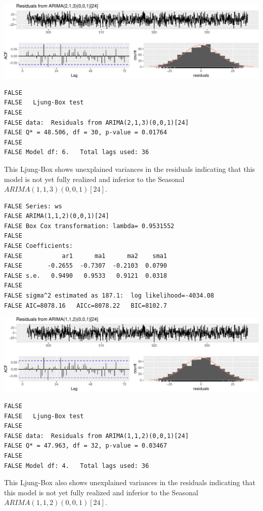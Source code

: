 \documentclass[openany]{book}
\begin{document}
\includegraphics{Part-C-BP_files/figure-latex/unnamed-chunk-11-1.pdf}

\begin{verbatim}
FALSE 
FALSE   Ljung-Box test
FALSE 
FALSE data:  Residuals from ARIMA(2,1,3)(0,0,1)[24]
FALSE Q* = 48.506, df = 30, p-value = 0.01764
FALSE 
FALSE Model df: 6.   Total lags used: 36
\end{verbatim}

This Ljung-Box shows unexplained variances in the residuals indicating
that this model is not yet fully realized and inferior to the Seasonal
\(ARIMA (1,1,3)(0,0,1)[24]\).

\begin{verbatim}
FALSE Series: ws 
FALSE ARIMA(1,1,2)(0,0,1)[24] 
FALSE Box Cox transformation: lambda= 0.9531552 
FALSE 
FALSE Coefficients:
FALSE           ar1      ma1      ma2    sma1
FALSE       -0.2655  -0.7307  -0.2103  0.0790
FALSE s.e.   0.9490   0.9533   0.9121  0.0318
FALSE 
FALSE sigma^2 estimated as 187.1:  log likelihood=-4034.08
FALSE AIC=8078.16   AICc=8078.22   BIC=8102.7
\end{verbatim}

\includegraphics{Part-C-BP_files/figure-latex/unnamed-chunk-12-1.pdf}

\begin{verbatim}
FALSE 
FALSE   Ljung-Box test
FALSE 
FALSE data:  Residuals from ARIMA(1,1,2)(0,0,1)[24]
FALSE Q* = 47.963, df = 32, p-value = 0.03467
FALSE 
FALSE Model df: 4.   Total lags used: 36
\end{verbatim}

This Ljung-Box also shows unexplained variances in the residuals
indicating that this model is not yet fully realized and inferior to the
Seasonal \(ARIMA (1,1,2)(0,0,1)[24]\).
\end{document}
